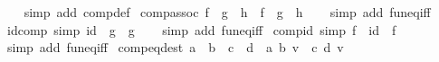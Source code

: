 \begin{isabellebody}
%
\isadelimproof
\ \ %
\endisadelimproof
%
\isatagproof
{}\isamarkupfalse%
\ {\isacharparenleft}{\kern0pt}simp\ add{\isacharcolon}{\kern0pt}\ comp{\isacharunderscore}{\kern0pt}def{\isacharparenright}{\kern0pt}%
\endisatagproof
{\isafoldproof}%
%
\isadelimproof
\isanewline
%
\endisadelimproof
\isanewline
{}\isamarkupfalse%
\ comp{\isacharunderscore}{\kern0pt}assoc{\isacharcolon}{\kern0pt}\ {\isachardoublequoteopen}{\isacharparenleft}{\kern0pt}f\ {\isasymcirc}\ g{\isacharparenright}{\kern0pt}\ {\isasymcirc}\ h\ {\isacharequal}{\kern0pt}\ f\ {\isasymcirc}\ {\isacharparenleft}{\kern0pt}g\ {\isasymcirc}\ h{\isacharparenright}{\kern0pt}{\isachardoublequoteclose}\isanewline
%
\isadelimproof
\ \ %
\endisadelimproof
%
\isatagproof
{}\isamarkupfalse%
\ {\isacharparenleft}{\kern0pt}simp\ add{\isacharcolon}{\kern0pt}\ fun{\isacharunderscore}{\kern0pt}eq{\isacharunderscore}{\kern0pt}iff{\isacharparenright}{\kern0pt}%
\endisatagproof
{\isafoldproof}%
%
\isadelimproof
\isanewline
%
\endisadelimproof
\isanewline
{}\isamarkupfalse%
\ id{\isacharunderscore}{\kern0pt}comp\ {\isacharbrackleft}{\kern0pt}simp{\isacharbrackright}{\kern0pt}{\isacharcolon}{\kern0pt}\ {\isachardoublequoteopen}id\ {\isasymcirc}\ g\ {\isacharequal}{\kern0pt}\ g{\isachardoublequoteclose}\isanewline
%
\isadelimproof
\ \ %
\endisadelimproof
%
\isatagproof
{}\isamarkupfalse%
\ {\isacharparenleft}{\kern0pt}simp\ add{\isacharcolon}{\kern0pt}\ fun{\isacharunderscore}{\kern0pt}eq{\isacharunderscore}{\kern0pt}iff{\isacharparenright}{\kern0pt}%
\endisatagproof
{\isafoldproof}%
%
\isadelimproof
\isanewline
%
\endisadelimproof
\isanewline
{}\isamarkupfalse%
\ comp{\isacharunderscore}{\kern0pt}id\ {\isacharbrackleft}{\kern0pt}simp{\isacharbrackright}{\kern0pt}{\isacharcolon}{\kern0pt}\ {\isachardoublequoteopen}f\ {\isasymcirc}\ id\ {\isacharequal}{\kern0pt}\ f{\isachardoublequoteclose}\isanewline
%
\isadelimproof
\ \ %
\endisadelimproof
%
\isatagproof
{}\isamarkupfalse%
\ {\isacharparenleft}{\kern0pt}simp\ add{\isacharcolon}{\kern0pt}\ fun{\isacharunderscore}{\kern0pt}eq{\isacharunderscore}{\kern0pt}iff{\isacharparenright}{\kern0pt}%
\endisatagproof
{\isafoldproof}%
%
\isadelimproof
\isanewline
%
\endisadelimproof
\isanewline
{}\isamarkupfalse%
\ comp{\isacharunderscore}{\kern0pt}eq{\isacharunderscore}{\kern0pt}dest{\isacharcolon}{\kern0pt}\ {\isachardoublequoteopen}a\ {\isasymcirc}\ b\ {\isacharequal}{\kern0pt}\ c\ {\isasymcirc}\ d\ {\isasymLongrightarrow}\ a\ {\isacharparenleft}{\kern0pt}b\ v{\isacharparenright}{\kern0pt}\ {\isacharequal}{\kern0pt}\ c\ {\isacharparenleft}{\kern0pt}d\ v{\isacharparenright}{\kern0pt}{\isachardoublequoteclose}\isanewline

\end{isabellebody}
